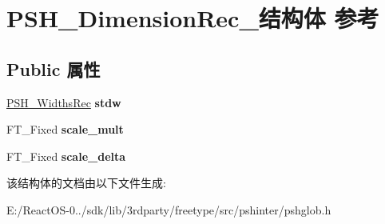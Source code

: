 \hypertarget{struct_p_s_h___dimension_rec__}{}\section{P\+S\+H\+\_\+\+Dimension\+Rec\+\_\+结构体 参考}
\label{struct_p_s_h___dimension_rec__}
\subsection*{Public 属性}
\begin{DoxyCompactItemize}
\item 
\mbox{\label{struct_p_s_h___dimension_rec___acf388dfaac8cb1c7ca9b5f6ad2b2f8a5}} 
\hyperlink{struct_p_s_h___widths_rec__}{P\+S\+H\+\_\+\+Widths\+Rec} {\bfseries stdw}
\item 
\mbox{\label{struct_p_s_h___dimension_rec___a0920c1e7f14cb5c759a41c14988bca80}} 
F\+T\+\_\+\+Fixed {\bfseries scale\+\_\+mult}
\item 
\mbox{\label{struct_p_s_h___dimension_rec___a7fe63fc51c731760358d242dee84cd53}} 
F\+T\+\_\+\+Fixed {\bfseries scale\+\_\+delta}
\end{DoxyCompactItemize}


该结构体的文档由以下文件生成\+:\begin{DoxyCompactItemize}
\item 
E\+:/\+React\+O\+S-\/0../sdk/lib/3rdparty/freetype/src/pshinter/pshglob.\+h\end{DoxyCompactItemize}
